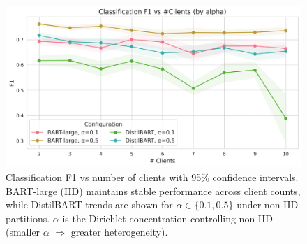 \documentclass[conference]{IEEEtran}
\begin{document}
\begin{figure}[H]
    \centering
    \includegraphics[width=\columnwidth]{../plots/classification/cls_f1_vs_clients_combined.png}
    \caption{Classification F1 vs number of clients with 95\% confidence intervals. BART-large (IID) maintains stable performance across client counts, while DistilBART trends are shown for $\alpha\in\{0.1, 0.5\}$ under non-IID partitions. $\alpha$ is the Dirichlet concentration controlling non-IID (smaller $\alpha$ $\Rightarrow$ greater heterogeneity).}
    \label{fig:cls_vs_clients}
\end{figure}
\end{document}
